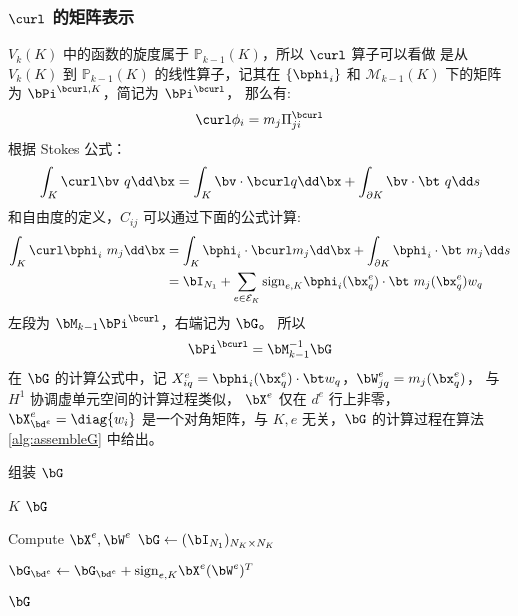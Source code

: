 \subsubsection{$\curl$ 的矩阵表示}
$V_k(K)$ 中的函数的旋度属于 $\mathbb{P}_{k-1}(K)$，所以 $\curl$ 算子可以看做
是从 $V_k(K)$ 到 $\mathbb{P}_{k-1}(K)$ 的线性算子，记其在 $\{\bphi_i\}$ 和 
$\mathcal{M}_{k-1}(K)$ 下的矩阵为 $\bPi^{\bcurl, K}$，简记为 $\bPi^{\bcurl}$， 
那么有:
$$
\curl \phi_i = m_j \Pi^{\bcurl}_{ji} 
$$
根据 Stokes 公式：
$$
\int_K \curl \bv \ q \dd \bx = \int_K \bv \cdot \bcurl q \dd \bx
+ \int_{\partial K} \bv \cdot \bt\ q \dd s
$$
和自由度的定义，$C_{ij}$ 可以通过下面的公式计算:
$$
\begin{aligned}
\int_K \curl \bphi_i \ m_j \dd \bx & = \int_K \bphi_i\cdot \bcurl m_j \dd \bx 
+ \int_{\partial K} \bphi_i\cdot \bt\ m_j \dd s\\
& = \bI_{N_1} + \sum_{e\in \mathcal{E}_K}\mathrm{sign}_{e, K} 
\bphi_i(\bx_q^e)\cdot \bt \ m_j(\bx_q^e)w_q 
\end{aligned}
$$
左段为 $\bM_{k-1}\bPi^{\bcurl}$，右端记为 $\bG$。
所以 
$$
\bPi^{\bcurl}
= \bM_{k-1}^{-1}\bG
$$
在 $\bG$ 的计算公式中，记
$X^e_{iq} = \bphi_i(\bx_q^e)\cdot \bt w_q$，$\bW^e_{jq} = m_j(\bx_q^e)$，
与 $H^1$ 协调虚单元空间的计算过程类似，
$\bX^e$ 仅在 $d^e$ 行上非零，$\bX^e_{\bd^e} = \diag\{w_i\}$ 是一个对角矩阵，与
$K, e$ 无关，$\bG$ 的计算过程在算法 \ref{alg:assembleG} 中给出。

\begin{algorithm}
\caption{组装 $\bG$}\label{alg:assembleG}
\begin{algorithmic}[1] %
\Require $K$ 
\Ensure $\bG$ 

\State Compute $\bX^e, \bW^e$
\State $\bG \gets (\bI_{N_1})_{N_K \times N_K}$

    \State $\bG_{\bd^e} \gets \bG_{\bd^e} + \mathrm{sign}_{e, K} \bX^e (\bW^{e})^T$
\EndFor

\State \Return $\bG$
\end{algorithmic}
\end{algorithm}


